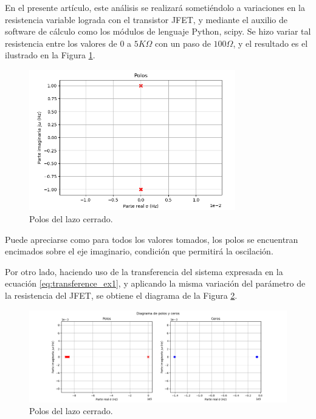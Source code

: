 En el presente artículo, este análisis se realizará sometiéndolo a variaciones en la resistencia variable lograda con el transistor JFET, y mediante el 
auxilio de software de cálculo como los módulos de lenguaje Python, scipy.
Se hizo variar tal resistencia entre los valores de $0$ a $5K\Omega$ con un paso de $100\Omega$, y el resultado es el ilustrado en la Figura \ref{fig:closed_loop_poles_ex1}.
\begin{figure}[H]
    \centering
    \includegraphics[width=0.8\textwidth]{../EJ1/Recursos/closed_loop_poles.png}
    \caption{Polos del lazo cerrado.}
    \label{fig:closed_loop_poles_ex1}    
\end{figure}

Puede apreciarse como para todos los valores tomados, los polos se encuentran encimados sobre el eje imaginario, condición que permitirá la oscilación.

Por otro lado, haciendo uso de la transferencia del sistema expresada en la ecuación \ref{eq:transference_ex1}, y aplicando la misma variación del parámetro 
de la resistencia del JFET, se obtiene el diagrama de la Figura \ref{fig:transference_poles_and_zeros_ex1}.
\begin{figure}[H]
    \centering
    \includegraphics[width=\textwidth]{../EJ1/Recursos/transference_poles_and_zeros.png}
    \caption{Polos del lazo cerrado.}
    \label{fig:transference_poles_and_zeros_ex1}    
\end{figure}


